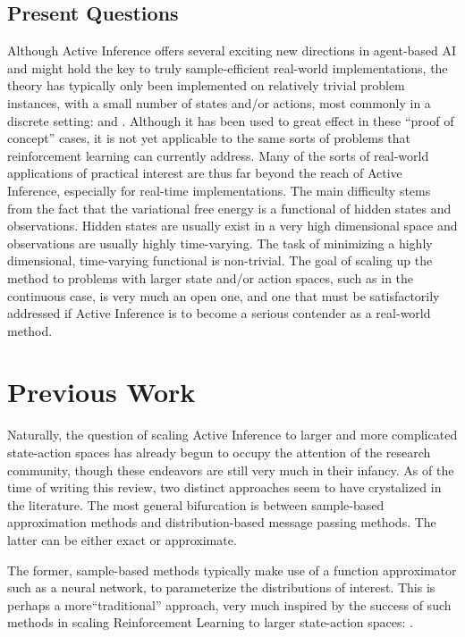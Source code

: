 \documentclass[onecolumn]{IEEEtran}
\begin{document}
\subsection{Present Questions}

Although Active Inference offers several exciting new directions in agent-based AI and might hold the key to truly sample-efficient real-world implementations, the theory has typically only been implemented on relatively trivial problem instances, with a small number of states and/or actions, most commonly in a discrete setting: \textcite{Uncertainty_Epistemics_AIF_Saccad} and \textcite{AIF-Epistemic-Value}. Although it has been used to great effect in these ``proof of concept'' cases, it is not yet applicable to the same sorts of problems that reinforcement learning can currently address. Many of the sorts of real-world applications of practical interest are thus far beyond the reach of Active Inference, especially for real-time implementations. The main difficulty stems from the fact that the variational free energy is a functional of hidden states and observations. Hidden states are usually exist in a very high dimensional space and observations are usually highly time-varying. The task of minimizing a highly dimensional, time-varying functional is non-trivial. The goal of scaling up the method to problems with larger state and/or action spaces, such as in the continuous case, is very much an open one, and one that must be satisfactorily addressed if Active Inference is to become a serious contender as a real-world method.  

\section{Previous Work}

Naturally, the question of scaling Active Inference to larger and more complicated state-action spaces has already begun to occupy the attention of the research community, though these endeavors are still very much in their infancy. As of the time of writing this review, two distinct approaches seem to have crystalized in the literature. The most general bifurcation is between sample-based approximation methods and distribution-based message passing methods. The latter can be either exact or approximate.

The former, sample-based methods typically make use of a function approximator such as a neural network, to parameterize the distributions of interest. This is perhaps a more``traditional'' approach, very much inspired by the success of such methods in scaling Reinforcement Learning to larger state-action spaces: \textcite{ATARI-Deep-RL}.
\end{document}
